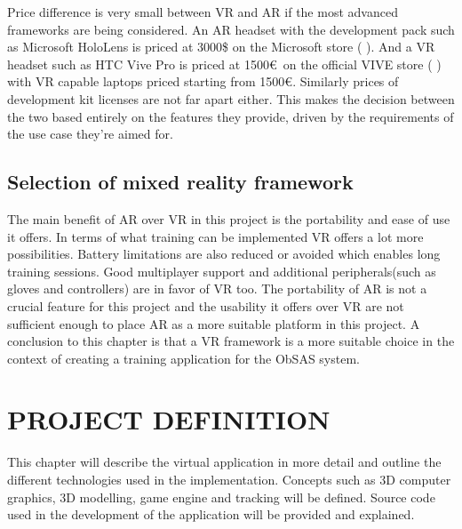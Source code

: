 \documentclass[12pt, a4paper,oneside, nocenter]{thesis}
\newcommand{\citeyeartitlexamkinline}[1]{(\usebibentry{#1}{title} \citeyear{#1})}
\begin{document}
\par
Price difference is very small between VR and AR if the most advanced frameworks are being considered. An AR headset with the development pack such as Microsoft HoloLens is priced at 3000\$ on the Microsoft store \citeyeartitlexamkinline{hololens-price}. And a VR headset such as HTC Vive Pro is priced at 1500\euro\ on the official VIVE store \citeyeartitlexamkinline{htc-vive-pro} with VR capable laptops priced starting from 1500\euro. Similarly prices of development kit licenses are not far apart either. This makes the decision between the two based entirely on the features they provide, driven by the requirements of the use case they're aimed for.
\par
\section{Selection of mixed reality framework}
The main benefit of AR over VR in this project is the portability and ease of use it offers. In terms of what training can be implemented VR offers a lot more possibilities. Battery limitations are also reduced or avoided which enables long training sessions. Good multiplayer support and additional peripherals(such as gloves and controllers) are in favor of VR too. The portability of AR is not a crucial feature for this project and the usability it offers over VR are not sufficient enough to place AR as a more suitable platform in this project. A conclusion to this chapter is that a VR framework is a more suitable choice in the context of creating a training application for the ObSAS system.
\par
\chapter{\MakeUppercase{Project definition}}
This chapter will describe the virtual application in more detail and outline the different technologies used in the implementation. Concepts such as 3D computer graphics, 3D modelling, game engine and tracking will be defined. Source code used in the development of the application will be provided and explained.
\par
\end{document}
